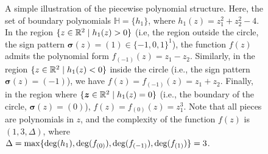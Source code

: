 \documentclass{article}
\theoremstyle{plain}
\theoremstyle{definition}
\theoremstyle{remark}
\begin{document}
\begin{figure}
    \centering

    
    \caption{
        A simple illustration of the piecewise polynomial structure. Here, the set of boundary polynomials $\mathbb{H} = \{h_1\}$, where $h_1(z) = z_1^2 + z_2^2 - 4$. In the region $\{z \in \mathbb{R}^2 \mid h_1(z) > 0\}$ (i.e, the region outside the circle, the sign pattern $\boldsymbol{\sigma}(z) = (1) \in \{-1, 0, 1\}^1$), the function $f(z)$ admits the polynomial form $f_{(-1)}(z) = z_1 - z_2$. Similarly, in the region $\{z \in \mathbb{R}^2 \mid h_1(z) < 0\}$ inside the circle (i.e., the sign pattern $\boldsymbol{\sigma}(z) = (-1)$), we have $f(z) = f_{(-1)}(z) = z_1 + z_2$. Finally, in the region where $\{\boldsymbol{z} \in \mathbb{R}^2 \mid h_1(z) = 0\}$ (i.e., the boundary of the circle, $\boldsymbol{\sigma}(z) = (0)$), $f(z) = f_{(0)}(z) = z_1^3$. Note that all pieces are polynomials in $z$, and the complexity of the function $f(z)$ is $(1, 3, \Delta)$, where $\Delta = \max\{\textup{deg}(h_1), \textup{deg}(f_{(0)}), \textup{deg}(f_{(-1)}), \textup{deg}(f_{(1)})\} = 3$.
    }
    \label{fig:piecwise-poly-structure}
\end{figure}  

 
\end{document}

